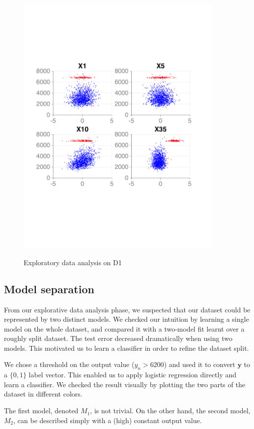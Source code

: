 \documentclass{article} %
\begin{document}
\begin{figure}[ht]
{      \includegraphics[width=4in]{figures/regression/model-separation-rough.pdf}
      \label{fig:regression-model-separation}
    }
    \caption{Exploratory data analysis on D1}
  \end{figure}

  \subsection{Model separation}
  From our explorative data analysis phase, we suspected that our dataset could be represented by two distinct models. We checked our intuition by learning a single model on the whole dataset, and compared it with a two-model fit learnt over a roughly split dataset. The test error decreased dramatically when using two models. This motivated us to learn a classifier in order to refine the dataset split.

  We chose a threshold on the output value ($y_n > 6200$) and used it to convert $\mathbf{y}$ to a $\{0, 1\}$ label vector. This enabled us to apply logistic regression directly and learn a classifier. We checked the result visually by plotting the two parts of the dataset in different colors.

  The first model, denoted $M_1$, is not trivial. On the other hand, the second model, $M_2$, can be described simply with a (high) constant output value.
\end{document}
